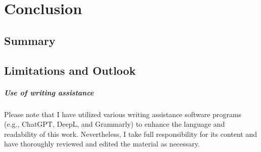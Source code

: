 \chapter{Conclusion}
\label{cha:Conclusion}

\section{Summary}
\label{sec:Summary}  

    
\section{Limitations and Outlook}
\label{sec:Limitations}


\paragraph*{Use of writing assistance}
Please note that I have utilized various writing assistance software programs (e.g., ChatGPT, DeepL, and Grammarly) to enhance the language and readability of this work. Nevertheless, I take full responsibility for its content and have thoroughly reviewed and edited the material as necessary.